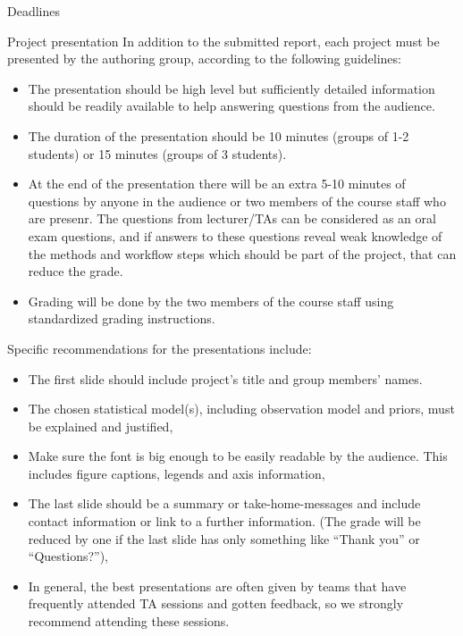 \documentclass[
  13pt,
  ignorenonframetext,
]{beamer}
\providecommand{\tightlist}{%
  \setlength{\itemsep}{0pt}\setlength{\parskip}{0pt}}
\begin{document}
\begin{frame}[fragile]{Deadlines}
\begin{block}{Project presentation}
\protect\hypertarget{project-presentation}{}
In addition to the submitted report, each project must be presented by
the authoring group, according to the following guidelines:

\begin{itemize}
\tightlist
\item
  The presentation should be high level but sufficiently detailed
  information should be readily available to help answering questions
  from the audience.
\item
  The duration of the presentation should be 10 minutes (groups of 1-2
  students) or 15 minutes (groups of 3 students).
\item
  At the end of the presentation there will be an extra 5-10 minutes of
  questions by anyone in the audience or two members of the course staff
  who are presenr. The questions from lecturer/TAs can be considered as
  an oral exam questions, and if answers to these questions reveal weak
  knowledge of the methods and workflow steps which should be part of
  the project, that can reduce the grade.
\item
  Grading will be done by the two members of the course staff using
  standardized grading instructions.
\end{itemize}

Specific recommendations for the presentations include:

\begin{itemize}
\tightlist
\item
  The first slide should include project's title and group members'
  names.
\item
  The chosen statistical model(s), including observation model and
  priors, must be explained and justified,
\item
  Make sure the font is big enough to be easily readable by the
  audience. This includes figure captions, legends and axis information,
\item
  The last slide should be a summary or take-home-messages and include
  contact information or link to a further information. (The grade will
  be reduced by one if the last slide has only something like ``Thank
  you'' or ``Questions?''),
\item
  In general, the best presentations are often given by teams that have
  frequently attended TA sessions and gotten feedback, so we strongly
  recommend attending these sessions.
\end{itemize}


\end{block}
\end{frame}
\end{document}
